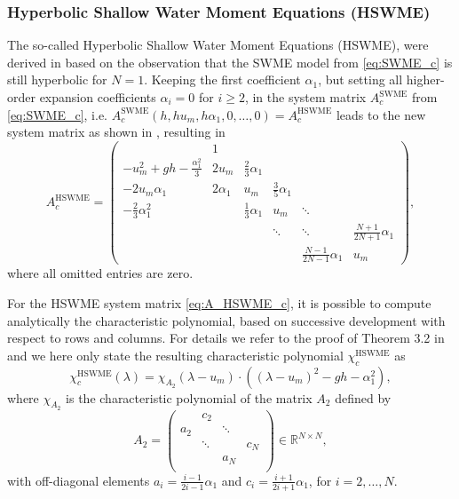 \documentclass[a4paper, 11pt]{article}
\begin{document}
\subsubsection{Hyperbolic Shallow Water Moment Equations (HSWME)}
The so-called Hyperbolic Shallow Water Moment Equations (HSWME), were derived in \cite{Koellermeier2020c} based on the observation that the SWME model from \eqref{eq:SWME_c} is still hyperbolic for $N=1$. Keeping the first coefficient $\alpha_1$, but setting all higher-order expansion coefficients $\alpha_i=0$ for $i \geq 2$, in the system matrix $A^{\textrm{SWME}}_{c}$ from \eqref{eq:SWME_c}, i.e. $A^{\textrm{SWME}}_{c}\left(h,hu_m,h \alpha_1, 0, \ldots, 0\right) = A^{\textrm{HSWME}}_{c}$ leads to the new system matrix as shown in \cite{Koellermeier2020c}, resulting in
\begin{equation}\label{eq:A_HSWME_c}
    A^{\textrm{HSWME}}_{c} =
    \left(\begin{array}{cccccc}
         & 1 &  &  &  &  \\
        -u_m^2 + gh - \frac{\alpha_1^2}{3} & 2u_m & \frac{2}{3} \alpha_1 & &\\
        -2u_m \alpha_1 & 2\alpha_1 & u_m & \frac{3}{5} \alpha_1 & &\\
        -\frac{2}{3}\alpha_1^2 &   & \frac{1}{3}\alpha_1 & u_m & \ddots & \\
         &  &  & \ddots & \ddots & \frac{N+1}{2N+1}\alpha_1 \\
         &  &  &  & \frac{N-1}{2N-1}\alpha_1 & u_m
    \end{array}\right),
\end{equation}
where all omitted entries are zero.

For the HSWME system matrix \eqref{eq:A_HSWME_c}, it is possible to compute analytically the characteristic polynomial, based on successive development with respect to rows and columns. For details we refer to the proof of Theorem 3.2 in \cite{Koellermeier2020c} and we here only state the resulting characteristic polynomial $\chi_c^{\textrm{HSWME}}$ as
\begin{equation}\label{eq:chi_HSWME_c}
    \chi_c^{\textrm{HSWME}}(\lambda) = \chi_{A_2}(\lambda- u_m) \cdot \left( (\lambda-u_m)^2 -gh-\alpha_1^2\right),
\end{equation}
where $\chi_{A_2}$ is the characteristic polynomial of the matrix $A_2$ defined by
\begin{equation}\label{eq:A_2}
        A_2 =
        \left(\begin{array}{cccc}
         & c_2 & &  \\
        a_2 & & \ddots &  \\
         & \ddots & & c_N \\
         &  & a_N &  \\
         \end{array}\right) \in \mathbb{R}^{N \times N},
\end{equation}
with off-diagonal elements $a_i= \frac{i-1}{2i-1} \alpha_1$ and $c_i= \frac{i+1}{2i+1} \alpha_1$, for $i=2, \ldots, N$.
\end{document}
